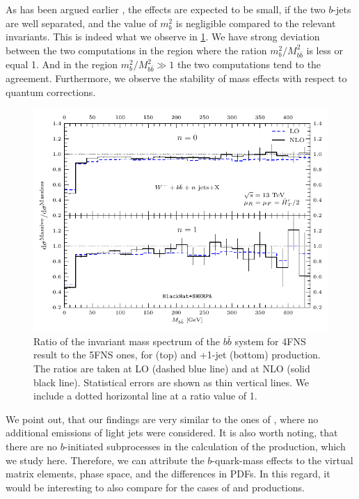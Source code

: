 As has been argued earlier \cite{FebresCordero:2006sj},
the effects are expected to be small, if the two $b$-jets are well separated,
and the value of $m_b^2$ is negligible compared to the relevant invariants.
This is indeed what we observe in \cref{fig:ratWmmbb}.
We have strong deviation between the two computations in the region where the ration $m_b^2/M_{b\bar{b}}^2$ 
is less or equal 1. And in the region $m_b^2/M_{b\bar{b}}^2\gg 1$ the two computations tend to the agreement.
Furthermore, we observe the stability of mass effects with respect to quantum corrections. 


\begin{figure}[ht]
  \centering
  \includegraphics[clip,scale=1.0]{plots/crmbb}
  \caption{Ratio of the invariant mass spectrum of the $b\bar b$ system for 4FNS
    result to the 5FNS ones, for \Wbbm{} (top) and \Wbbm+1-jet (bottom) production.
    The ratios are taken at LO (dashed blue line) and at NLO (solid black line).
    Statistical errors are shown as thin vertical lines. We include a dotted
  horizontal line at a ratio value of 1.}
  \label{fig:ratWmmbb}
\end{figure}

We point out, that our findings are very similar to the ones of \cite{FebresCordero:2006sj},
where no additional emissions of light jets were considered.
It is also worth noting, that
there are no $b$-initiated subprocesses in the calculation  of the \Wbbnj[1]{} production,
which we study here.
Therefore, we can attribute the $b$-quark-mass effects to the virtual matrix elements,
phase space, and the differences in PDFs.
In this regard, it would be interesting to also compare for the cases of \Wbbjj{} and \Wbbjjj{}
productions.

